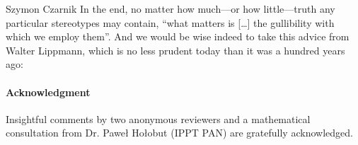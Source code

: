 \begin{artengenv}{Szymon Czarnik}
In the end, no matter how much—or how little—truth any particular stereotypes may contain, ``what matters is […] the gullibility with which we employ them''. And we would be wise indeed to take this advice from Walter Lippmann, which is no less prudent today than it was a hundred years ago:



\paragraph{Acknowledgment}
Insightful comments by two anonymous reviewers and a mathematical consultation from Dr. Paweł Hołobut (IPPT PAN) are gratefully acknowledged.

\end{artengenv}
